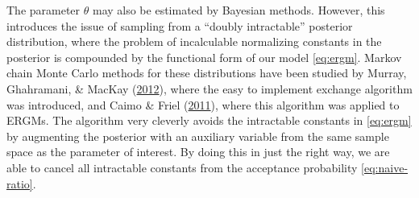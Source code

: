 \documentclass[12pt,twoside]{reedthesis}
\theoremstyle{definition}
\theoremstyle{definition}
\theoremstyle{remark}
\begin{document}
The parameter \(\theta\) may also be estimated by Bayesian methods.
However, this introduces the issue of sampling from a ``doubly
intractable'' posterior distribution, where the problem of incalculable
normalizing constants in the posterior is compounded by the functional
form of our model \eqref{eq:ergm}. Markov chain Monte Carlo methods for
these distributions have been studied by Murray, Ghahramani, \& MacKay
(\protect\hyperlink{ref-Murray2012}{2012}), where the easy to implement
exchange algorithm was introduced, and Caimo \& Friel
(\protect\hyperlink{ref-Caimo2011}{2011}), where this algorithm was
applied to ERGMs. The algorithm very cleverly avoids the intractable
constants in \eqref{eq:ergm} by augmenting the posterior with an auxiliary
variable from the same sample space as the parameter of interest. By
doing this in just the right way, we are able to cancel all intractable
constants from the acceptance probability \eqref{eq:naive-ratio}.
\end{document}
